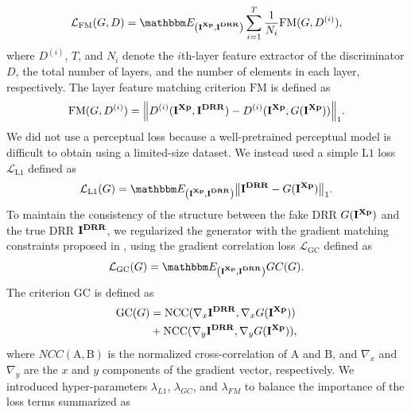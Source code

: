 \documentclass[times,twocolumn,final]{elsarticle}
\begin{document}
{\begin{equation}
\begin{split}
    \mathcal{L}_{\mathrm{FM}}(G,D)=\Exraydrr\sum_{i=1}^{T}\frac{1}{N_{i}}\mathrm{FM}(G,D^{(i)}),
\end{split}
\end{equation}
where $D^{(i)}$, $T$, and $N_{i}$ denote the $i$th-layer feature extractor of the discriminator $D$, the total number of layers, and the number of elements in each layer, respectively. The layer feature matching criterion $\mathrm{FM}$ is defined as
\begin{equation}
\begin{split}
    \mathrm{FM}(G,D^{(i)})=\norm{D^{(i)}(\bm{\mathrm{I^{Xp}}},\bm{\mathrm{I^{DRR}}})-D^{(i)}(\bm{\mathrm{I^{Xp}}},G(\bm{\mathrm{I^{Xp}}}))}_1.
\end{split}
\end{equation}
We did not use a perceptual loss because a well-pretrained perceptual model is difficult to obtain using a limited-size dataset. We instead used a simple $\mathrm{L1}$ loss $\mathcal{L}_{\mathrm{L1}}$ defined as
\begin{equation}
\begin{split}
    \mathcal{L}_{\mathrm{L1}}(G)=\Exraydrr\norm{\imgdrr-G(\imgxray)}_1.
    \label{eq:Ll1}
\end{split}
\end{equation}
To maintain the consistency of the structure between the fake DRR $G(\bm{\mathrm{I^{Xp}}})$ and the true DRR $\bm{\mathrm{I^{DRR}}}$, we regularized the generator with the gradient matching constraints proposed in \citep{penney_comparison_1998}, using the gradient correlation loss \citep{hiasa_cross_2018} $\mathcal{L}_{\mathrm{GC}}$ defined as
\begin{equation}
    \mathcal{L}_{\mathrm{GC}}(G)=\Exraydrr GC(G).
\end{equation}
The criterion $\mathrm{GC}$ is defined as
\begin{equation}
\begin{split}
        \mathrm{GC}(G)
        & =\mathrm{NCC}(\nabla_{x}\bm{\mathrm{I^{DRR}}},\nabla_x G(\bm{\mathrm{I^{Xp}}}))\\
        & +\mathrm{NCC}(\nabla_{y}\bm{\mathrm{I^{DRR}}},\nabla_y G(\bm{\mathrm{I^{Xp}}})),
\end{split}
\end{equation}
where $NCC(\bm{\mathrm{A}},\bm{\mathrm{B}})$ is the normalized cross-correlation of $\bm{\mathrm{A}}$ and $\bm{\mathrm{B}}$, and $\nabla_{x}$ and $\nabla_{y}$ are the $x$ and $y$ components of the gradient vector, respectively. We introduced hyper-parameters $\lambda_{L1}$, $\lambda_{GC}$, and $\lambda_{FM}$ to balance the importance of the loss terms summarized as
}
\end{document}
